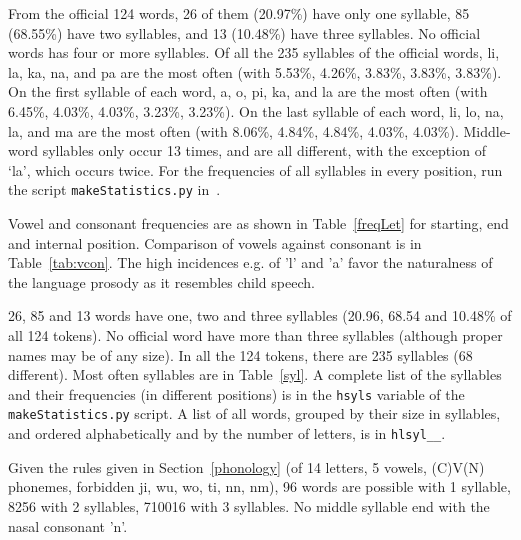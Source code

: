 \documentclass{article}
\newcommand{\tttt}[1]{\texttt{#1}}
\begin{document}


From the official 124 words, 
26 of them (20.97\%)
have only one syllable,
85 (68.55\%) have two syllables,
and 13 (10.48\%) have three syllables.
No official words has four or more syllables.
Of all the 235 syllables of the official words,
li, la, ka, na, and pa are the most often (with 5.53\%,
4.26\%, 3.83\%,  3.83\%, 3.83\%).
On the first syllable of each word,
a, o, pi, ka, and la are the most often
(with 6.45\%, 4.03\%, 4.03\%, 3.23\%, 3.23\%).
On the last syllable of each word,
li, lo, na, la, and ma are the most often
(with 8.06\%, 4.84\%, 4.84\%, 4.03\%, 4.03\%).
Middle-word syllables only occur 13 times,
and are all different, with the exception of `la',
which occurs twice.
For the frequencies of all syllables in every position,
run the script \tttt{makeStatistics.py} in~\cite{tokipona}.

Vowel and consonant frequencies are as shown in Table~\ref{freqLet}
for starting, end and internal position.
Comparison of vowels against consonant is in Table~\ref{tab:vcon}.
The high incidences e.g. of 'l' and 'a' favor
the naturalness of the language prosody
as it resembles child speech.



26, 85 and 13 words have one, two and three syllables
(20.96, 68.54 and 10.48\% of all 124 tokens).
No official word have more than three syllables
(although proper names may be of any size).
In all the 124 tokens, there are 235 syllables (68 different).
Most often syllables are in
Table~\ref{syl}.
A complete list of the syllables and their frequencies (in different
positions) is in the \tttt{hsyls} variable of the \tttt{makeStatistics.py}
script.
A list of all words, grouped by their size in syllables,
and ordered alphabetically and by the number of letters,
is in \tttt{hlsyl\_\_}.



Given the rules given in Section~\ref{phonology}
(of 14 letters, 5 vowels, (C)V(N) phonemes,
forbidden ji, wu, wo, ti, nn, nm),
96 words are possible with 1 syllable,
8256 with 2 syllables, 710016 with 3 syllables.
No middle syllable end with the nasal consonant 'n'.
\end{document}
